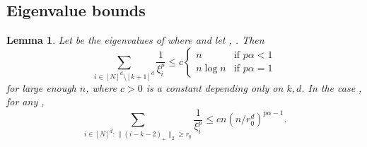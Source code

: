 \documentclass[ejs,noshowframe]{imsart}
\theoremstyle{plain}
\newtheorem{lemma}[theorem]{Lemma}
\theoremstyle{definition}
\renewcommand{\top}{\mathsf{T}}
\begin{document}
\begin{appendix}
\subsection{Eigenvalue bounds}
\label{sec:eigenvalue-bounds}

\begin{lemma}
	\label{lem:kron_tf_evals}
	Let  be the eigenvalues
	of 
	\smash{$D^\top D$} where  and let , . Then
	\begin{equation*}
			\sum_{i \in [N]^d \setminus [k+1]^d} \frac{1}{\xi_{i}^p} 
			\leq c
			\begin{cases}
					n & \text{if } p \alpha < 1\\
					n \log n & \text{if } p\alpha = 1
				\end{cases}
		\end{equation*}
		for large enough $n$, where $c>0$ is a constant depending only on  
	$k, d$. 
In the case , for any ,
	\begin{equation*}
		\sum_{i \in [N]^d : \| (i-k-2)_+ \|_2 \ge r_0 } \frac{1}{\xi_{i}^p} \leq 
		c n (n/r_0^d)^{p\alpha - 1}.
	\end{equation*}
\end{lemma}



\end{appendix}
\end{document}
